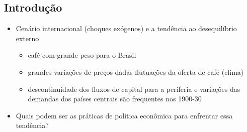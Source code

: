 \documentclass[a4paper,12pt]{article}[abntex2]
\begin{document}
\subsection{\textbf{Introdução}}
\begin{itemize}
    \item Cenário internacional (choques exógenos) e a tendência ao desequilíbrio externo
    \begin{itemize}
        \item café com grande peso para o Brasil
    \end{itemize}
    \begin{itemize}
        \item  grandes variações de preços dadas flutuações da oferta de café (clima)
    \end{itemize}
    \begin{itemize}
        \item descontinuidade dos fluxos de capital para a periferia e variações das demandas dos países centrais são frequentes nos 1900-30
    \end{itemize}
    \item Quais podem ser as práticas de política econômica para enfrentar essa tendência?
\end{itemize}
\end{document}
